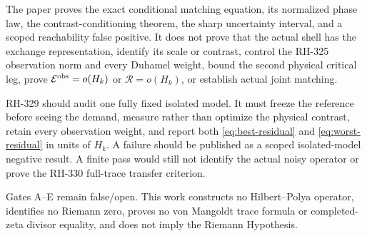 \documentclass[11pt]{article}
\theoremstyle{remark}
\newcommand{\cE}{\mathcal E}
\newcommand{\cR}{\mathcal R}
\begin{document}
The paper proves the exact conditional matching equation, its normalized
phase law, the contrast-conditioning theorem, the sharp uncertainty
interval, and a scoped reachability false positive.  It does not prove that
the actual shell has the exchange representation, identify its scale or
contrast, control the RH-325 observation norm and every Duhamel weight, bound
the second physical critical leg, prove
$\cE^{\rm obs}=o(H_k)$ or $\cR=o(H_k)$, or establish actual joint matching.

RH-329 should audit one fully fixed isolated model.  It must freeze the
reference before seeing the demand, measure rather than optimize the physical
contrast, retain every observation weight, and report both
\eqref{eq:best-residual} and \eqref{eq:worst-residual} in units of $H_k$.
A failure should be published as a scoped isolated-model negative result.  A
finite pass would still not identify the actual noisy operator or prove the
RH-330 full-trace transfer criterion.

Gates A--E remain false/open.  This work constructs no Hilbert--Polya
operator, identifies no Riemann zero, proves no von Mangoldt trace formula or
completed-zeta divisor equality, and does not imply the Riemann Hypothesis.
\end{document}
